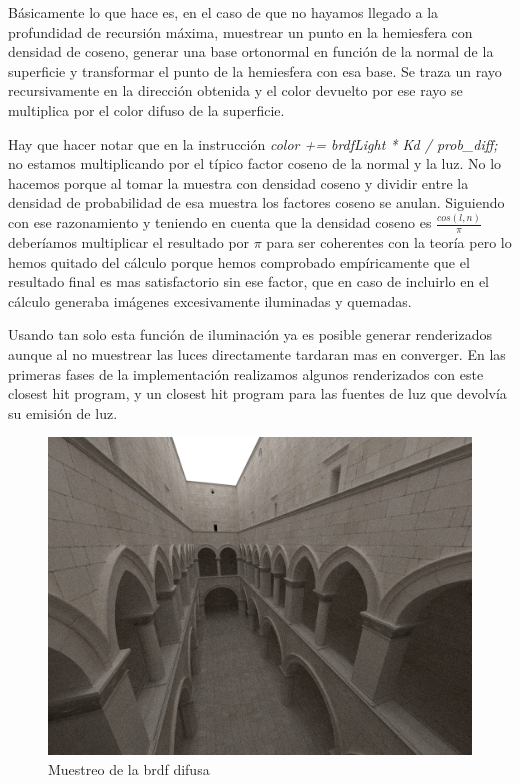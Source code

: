Básicamente lo que hace es, en el caso de que no hayamos llegado a la profundidad de recursión máxima, muestrear un punto en la hemiesfera con densidad de coseno, generar una base ortonormal en función de la normal de la superficie y transformar el punto de la hemiesfera con esa base. Se traza un rayo recursivamente en la dirección obtenida y el color devuelto por ese rayo se multiplica por el color difuso de la superficie.

\medskip

Hay que hacer notar que en la instrucción \emph{color += brdfLight * Kd / prob\_diff;} no estamos multiplicando por el típico factor coseno de la normal y la luz. No lo hacemos porque al tomar la muestra con densidad coseno y dividir entre la densidad de probabilidad de esa muestra los factores coseno se anulan.
Siguiendo con ese razonamiento y teniendo en cuenta que la densidad coseno es $\frac{cos(l,n)}{\pi}$ deberíamos multiplicar el resultado por $\pi$ para ser coherentes con la teoría pero lo hemos quitado del cálculo porque hemos comprobado empíricamente que el resultado final es mas satisfactorio sin ese factor, que en caso de incluirlo en el cálculo generaba imágenes excesivamente iluminadas y quemadas.

\medskip

Usando tan solo esta función de iluminación ya es posible generar renderizados aunque al no muestrear las luces directamente tardaran mas en converger.
En las primeras fases de la implementación realizamos algunos renderizados con este closest hit program, y un closest hit program para las fuentes de luz que devolvía su emisión de luz.


\begin{figure}[h]
\centering
\includegraphics[width=5in]{dome1.png}
\caption{Muestreo de la brdf difusa}
\end{figure}

